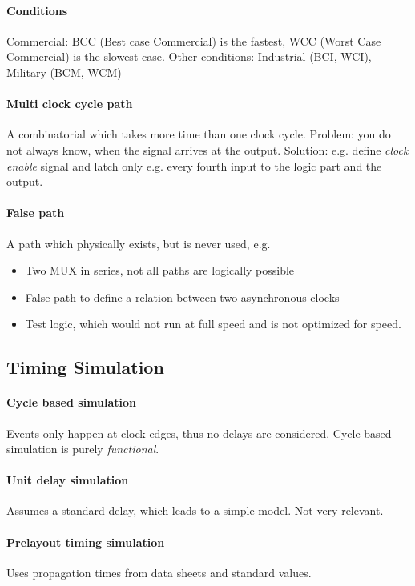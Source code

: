 \paragraph{Conditions}Commercial: BCC (Best case Commercial) is the fastest, WCC (Worst Case Commercial) is the slowest case. Other conditions: Industrial (BCI, WCI), Military (BCM, WCM) \\

\paragraph{Multi clock cycle path}A combinatorial which takes more time than one clock cycle. 
Problem: you do not always know, when the signal arrives at the output. 
Solution: e.g. define \emph{clock enable} signal and latch only e.g. every fourth input to the logic part and the output.

\paragraph{False path}A path which physically exists, but is never used, e.g.
\begin{itemize}
    \item Two MUX in series, not all paths are logically possible
    \item False path to define a relation between two asynchronous clocks
    \item Test logic, which would not run at full speed and is not optimized for speed.
\end{itemize}

\subsection{Timing Simulation}
\paragraph{Cycle based simulation}
Events only happen at clock edges, thus no delays are considered.
Cycle based simulation is purely \emph{functional}.
\paragraph{Unit delay simulation}
Assumes a standard delay, which leads to a simple model. Not very relevant.
\paragraph{Prelayout timing simulation}
Uses propagation times from data sheets and standard values.
